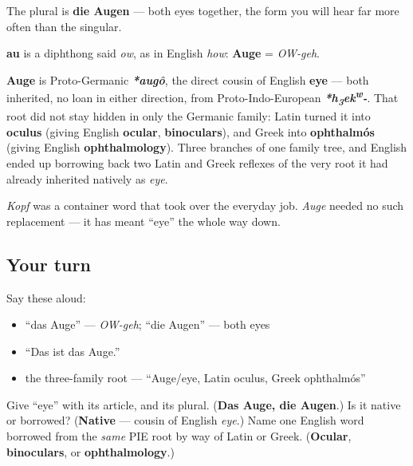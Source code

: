 The plural is \textbf{die Augen} — both eyes together, the form you will hear far more often than the singular.

\begin{sounds}
\textbf{au} is a diphthong said \emph{ow}, as in English \emph{how}: \textbf{Auge} = \emph{OW-geh}.
\end{sounds}

\begin{cousinweb}
\textbf{Auge} is Proto-Germanic \emph{\textbf{*augô}}, the direct cousin of English \textbf{eye} — both inherited, no loan in either direction, from Proto-Indo-European \emph{\textbf{*h\textsubscript{3}ek\textsuperscript{w}-}}. That root did not stay hidden in only the Germanic family: Latin turned it into \textbf{oculus} (giving English \textbf{ocular}, \textbf{binoculars}), and Greek into \textbf{ophthalmós} (giving English \textbf{ophthalmology}). Three branches of one family tree, and English ended up borrowing back two Latin and Greek reflexes of the very root it had already inherited natively as \emph{eye}.

\emph{Kopf} was a container word that took over the everyday job. \emph{Auge} needed no such replacement — it has meant \textquotedblleft{}eye\textquotedblright{} the whole way down.
\end{cousinweb}

\subsection*{Your turn}
Say these aloud:

\begin{itemize}
\raggedright
  \item \textquotedblleft{}das Auge\textquotedblright{} — \emph{OW-geh}; \textquotedblleft{}die Augen\textquotedblright{} — both eyes
  \item \textquotedblleft{}Das ist das Auge.\textquotedblright{}
  \item the three-family root — \textquotedblleft{}Auge/eye, Latin oculus, Greek ophthalmós\textquotedblright{}
\end{itemize}

\begin{tcolorbox}[breakable,colback=teal!4,colframe=teal!35!black,title={Before you move on}]
Give \textquotedblleft{}eye\textquotedblright{} with its article, and its plural. (\textbf{Das Auge, die Augen}.) Is it native or borrowed? (\textbf{Native} — cousin of English \emph{eye}.) Name one English word borrowed from the \emph{same} PIE root by way of Latin or Greek. (\textbf{Ocular}, \textbf{binoculars}, or \textbf{ophthalmology}.)
\end{tcolorbox}
